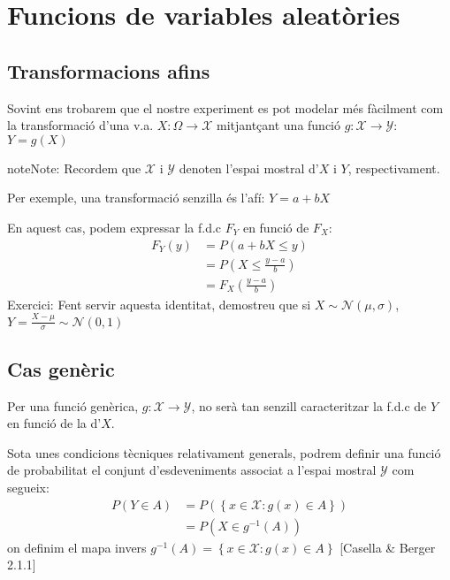 \documentclass[letterpaper,10pt,english]{sphinxmanual}
\begin{document}
\section{Funcions de variables aleatòries}
\label{\detokenize{0_Intro/0_1_Repas_probabilitat:funcions-de-variables-aleatories}}

\subsection{Transformacions afins}
\label{\detokenize{0_Intro/0_1_Repas_probabilitat:transformacions-afins}}
Sovint ens trobarem que el nostre experiment es pot modelar més fàcilment
com la transformació d’una v.a. \(X: \Omega \to \mathcal{X}\) mitjantçant una funció
\(g: \mathcal{X}\to\mathcal{Y}\): \(Y=g\left(X\right)\)

\begin{sphinxadmonition}{note}{Note:}
Recordem que \(\mathcal{X}\) i \(\mathcal{Y}\) denoten l’espai mostral d’\(X\)
i \(Y\), respectivament.
\end{sphinxadmonition}

Per exemple, una transformació senzilla és l’afí: \(Y = a + b X\)

En aquest cas, podem expressar la f.d.c \(F_Y\) en funció de \(F_X\):
\begin{equation*}
\begin{split}F_Y\left(y\right) &= P\left( a + b X \leq y \right) \\
                  &= P\left( X \leq \frac{y - a}{b} \right) \\
                  &= F_X\left(\frac{y - a}{b} \right)\end{split}
\end{equation*}
Exercici: Fent servir aquesta identitat, demostreu que si \(X \sim \mathcal{N}\left(\mu, \sigma\right)\), \(Y = \frac{X - \mu}{\sigma} \sim \mathcal{N}\left(0, 1\right)\)


\subsection{Cas genèric}
\label{\detokenize{0_Intro/0_1_Repas_probabilitat:cas-generic}}
Per una funció genèrica, \(g: \mathcal{X}\to\mathcal{Y}\),
no serà tan senzill caracteritzar la f.d.c de \(Y\) en funció de la d’\(X\).

Sota unes condicions tècniques relativament generals, podrem definir una funció de
probabilitat el conjunt d’esdeveniments associat a l’espai mostral \(\mathcal{Y}\) com segueix:
\begin{equation*}
\begin{split}P\left(Y \in A\right) & = P\left(\left\{x \in \mathcal{X}: g\left(x\right) \in A \right\}\right) \\
                      & = P\left(X \in g^{-1}\left(A\right)\right)\end{split}
\end{equation*}
on definim el mapa invers \(g^{-1}\left(A\right) = \left\{ x\in \mathcal{X}: g(x) \in A\right\}\) {[}Casella \& Berger 2.1.1{]}
\end{document}
